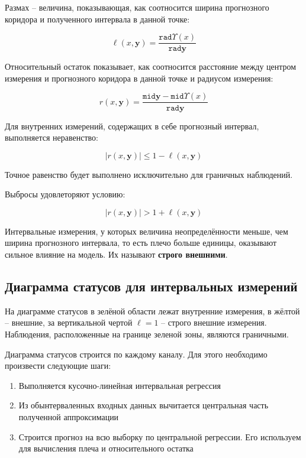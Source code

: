 \begin{definition}
	Размах -- величина, показывающая, как соотносится ширина прогнозного коридора и полученного интервала в данной точке:
	
	\begin{equation}
	\ell(x, \mathbf{y}) = \frac{\mathtt{rad} \Upsilon(x)}{\mathtt{rad} \mathbf{y}}
	\end{equation}
\end{definition}

\begin{definition}
	Относительный остаток показывает, как соотносится расстояние между центром измерения и прогнозного коридора в данной точке и радиусом измерения:
	
	\begin{equation}
	r(x, \mathbf{y}) = \frac{\mathtt{mid} \mathbf{y} - \mathtt{mid} \Upsilon(x)}{\mathtt{rad} \mathbf{y}}
	\end{equation}
\end{definition}

Для внутренних измерений, содержащих в себе прогнозный интервал, выполняется неравенство:

\begin{equation}
|r(x, \mathbf{y})| \leq 1 - \ell(x, \mathbf{y})
\end{equation}

Точное равенство будет выполнено исключительно для граничных наблюдений.

Выбросы удовлеторяют условию:

\begin{equation}
|r(x, \mathbf{y})| > 1 + \ell(x, \mathbf{y})
\end{equation}

Интервальные измерения, у которых величина неопределённости меньше, чем ширина прогнозного интервала, то есть плечо больше единицы, оказывают сильное влияние на модель. Их называют \textbf{строго внешними}.

\subsection{Диаграмма статусов для интервальных измерений}

На диаграмме статусов в зелёной области лежат внутренние измерения, в жёлтой -- внешние, за вертикальной чертой $\ell = 1$ -- строго внешние измерения. Наблюдения, расположенные на границе зеленой зоны, являются граничными.


Диаграмма статусов строится по каждому каналу.
Для этого необходимо произвести следующие шаги:
\begin{enumerate}
	\item Выполняется кусочно-линейная интервальная регрессия
	\item Из обынтерваленных входных данных вычитается центральная часть полученной аппроксимации
	\item Строится прогноз на всю выборку по центральной регрессии. Его используем для вычисления плеча и относительного остатка
\end{enumerate}